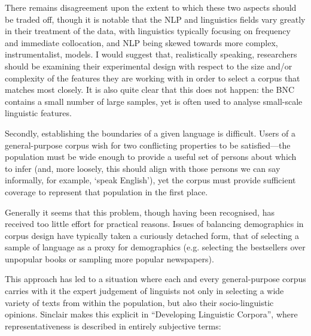 There remains disagreement upon the extent to which these two aspects should be traded off, though it is notable that the NLP and linguistics fields vary greatly in their treatment of the data, with linguistics typically focusing on frequency and immediate collocation, and NLP being skewed towards more complex, instrumentalist, models.%
I would suggest that, realistically speaking, researchers should be examining their experimental design with respect to the size and/or complexity of the features they are working with in order to select a corpus that matches most closely.  It is also quite clear that this does not happen: the BNC contains a small number of large samples, yet is often used to analyse small-scale linguistic features.



Secondly, establishing the boundaries of a given language is difficult.  Users of a general-purpose corpus wish for two conflicting properties to be satisfied---the population must be wide enough to provide a useful set of persons about which to infer (and, more loosely, this should align with those persons we can say informally, for example, `speak English'), yet the corpus must provide sufficient coverage to represent that population in the first place.

Generally it seems that this problem, though having been recognised, has received too little effort for practical reasons.  Issues of balancing demographics in corpus design have typically taken a curiously detached form, that of selecting a sample of language as a proxy for demographics (e.g. selecting the bestsellers over unpopular books or sampling more popular newspapers).


This approach has led to a situation where each and every general-purpose corpus carries with it the expert judgement of linguists not only in selecting a wide variety of texts from within the population, but also their socio-linguistic opinions.  Sinclair makes this explicit in ``Developing Linguistic Corpora'', where representativeness is described in entirely subjective terms\cite[p.5]{wynne2005developing}:

